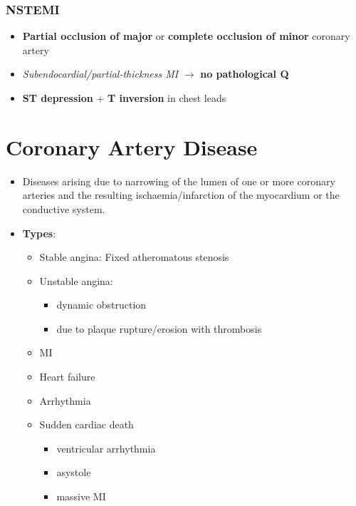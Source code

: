 \documentclass[
  12pt,
]{memoir}
\providecommand{\tightlist}{%
  \setlength{\itemsep}{0pt}\setlength{\parskip}{0pt}}
\begin{document}
\hypertarget{nstemi}{%
\subsubsection{NSTEMI}\label{nstemi}}

\begin{itemize}
\tightlist
\item
  \textbf{Partial occlusion of major} or \textbf{complete occlusion of
  minor} coronary artery
\item
  \emph{Subendocardial/partial-thickness MI} \(\rightarrow\) \textbf{no
  pathological Q}
\item
  \textbf{ST depression} + \textbf{T inversion} in chest leads
\end{itemize}

\hypertarget{coronary-artery-disease}{%
\section{Coronary Artery Disease}\label{coronary-artery-disease}}

\begin{itemize}
\tightlist
\item
  Diseases arising due to narrowing of the lumen of one or more coronary
  arteries and the resulting ischaemia/infarction of the myocardium or
  the conductive system.
\item
  \textbf{Types}:

  \begin{itemize}
  \tightlist
  \item
    Stable angina: Fixed atheromatous stenosis
  \item
    Unstable angina:

    \begin{itemize}
    \tightlist
    \item
      dynamic obstruction
    \item
      due to plaque rupture/erosion with thrombosis
    \end{itemize}
  \item
    MI
  \item
    Heart failure
  \item
    Arrhythmia
  \item
    Sudden cardiac death

    \begin{itemize}
    \tightlist
    \item
      ventricular arrhythmia
    \item
      asystole
    \item
      massive MI
    \end{itemize}
  \end{itemize}
\end{itemize}
\end{document}
